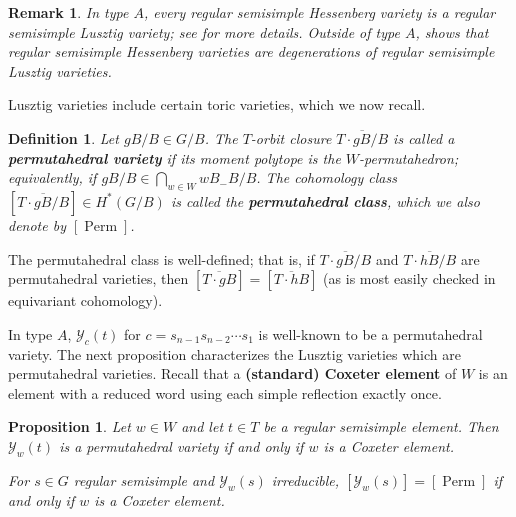 \documentclass[10pt,a4paper]{amsart}
\newtheorem{proposition}[Thm]{Proposition}
\newtheorem{definition}[Thm]{Definition}
\newtheorem{remark}[Thm]{Remark}
\DeclareMathOperator{\Perm}{Perm}
\newcommand\defn[1]{{\bf #1}}
\newcommand\calY{{\mathcal Y}}
\begin{document}
\begin{remark}\label{rem:Hessdegen}
	In type $A$, every regular semisimple Hessenberg variety is a regular
	semisimple Lusztig variety; see \cite{BHL25-geomLusztig} for more
	details. Outside of type $A$, \cite[Theorem 5.12]{BHL25-geomLusztig}
	shows that regular semisimple Hessenberg varieties are degenerations
	of regular semisimple Lusztig varieties. 
\end{remark}

Lusztig varieties include certain toric varieties, which we now recall.

\begin{definition}
	Let $gB/B \in G/B$. The $T$-orbit closure $\overline{T \cdot gB/B}$ is
	called a \defn{permutahedral variety} if its moment polytope is the
	$W$-permutahedron; equivalently, if $gB/B \in \bigcap_{w\in W} wB_-B/B$.
	The cohomology class
	$[\overline{T \cdot gB/B}] \in H^*(G/B)$ is called the
	\defn{permutahedral class}, which we also denote by $[\Perm]$.
\end{definition}

The permutahedral class is well-defined; that is, if
$\overline{T \cdot gB/B}$ and $\overline{T \cdot hB/B}$ are permutahedral
varieties, then $[\overline{T \cdot gB}] = [\overline{T \cdot hB}]$
(as is most easily checked in equivariant cohomology).

In type $A$, 
$\calY_{c}(t)$ for $c = s_{n-1}s_{n-2}\cdots s_1$
is well-known to be a permutahedral variety. The next proposition characterizes the Lusztig varieties which are permutahedral varieties. Recall that a \defn{(standard) Coxeter element} of $W$ is an element with a reduced word using each simple reflection exactly once.

\begin{proposition} \label{prop:lusztig-permutahedral}
	Let $w \in W$ and let $t\in T$ be a regular semisimple element. Then
	$\calY_w(t)$ is a permutahedral variety if and only if $w$ is a
	Coxeter element. 
	
	For $s\in G$ regular semisimple and $\calY_w(s)$ irreducible, $[\calY_w(s)]= [\Perm]$ if and only if $w$ is a Coxeter element.
\end{proposition}
\end{document}
